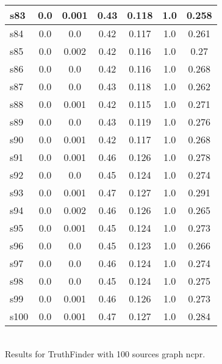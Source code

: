 \documentclass{article}
\begin{document}
\begin{tabular}{|l|c|c|c|c|c|c|}
\hline
s83 &0.0 & 0.001 & 0.43 & 0.118 & 1.0 & 0.258\\
\hline
s84 &0.0 & 0.0 & 0.42 & 0.117 & 1.0 & 0.261\\
\hline
s85 &0.0 & 0.002 & 0.42 & 0.116 & 1.0 & 0.27\\
\hline
s86 &0.0 & 0.0 & 0.42 & 0.116 & 1.0 & 0.268\\
\hline
s87 &0.0 & 0.0 & 0.43 & 0.118 & 1.0 & 0.262\\
\hline
s88 &0.0 & 0.001 & 0.42 & 0.115 & 1.0 & 0.271\\
\hline
s89 &0.0 & 0.0 & 0.43 & 0.119 & 1.0 & 0.276\\
\hline
s90 &0.0 & 0.001 & 0.42 & 0.117 & 1.0 & 0.268\\
\hline
s91 &0.0 & 0.001 & 0.46 & 0.126 & 1.0 & 0.278\\
\hline
s92 &0.0 & 0.0 & 0.45 & 0.124 & 1.0 & 0.274\\
\hline
s93 &0.0 & 0.001 & 0.47 & 0.127 & 1.0 & 0.291\\
\hline
s94 &0.0 & 0.002 & 0.46 & 0.126 & 1.0 & 0.265\\
\hline
s95 &0.0 & 0.001 & 0.45 & 0.124 & 1.0 & 0.273\\
\hline
s96 &0.0 & 0.0 & 0.45 & 0.123 & 1.0 & 0.266\\
\hline
s97 &0.0 & 0.0 & 0.46 & 0.124 & 1.0 & 0.274\\
\hline
s98 &0.0 & 0.0 & 0.45 & 0.124 & 1.0 & 0.275\\
\hline
s99 &0.0 & 0.001 & 0.46 & 0.126 & 1.0 & 0.273\\
\hline
s100 &0.0 & 0.001 & 0.47 & 0.127 & 1.0 & 0.284\\
\hline
\end{tabular}\\

\noindent Results for TruthFinder with 100 sources graph ncpr.
\end{document}
